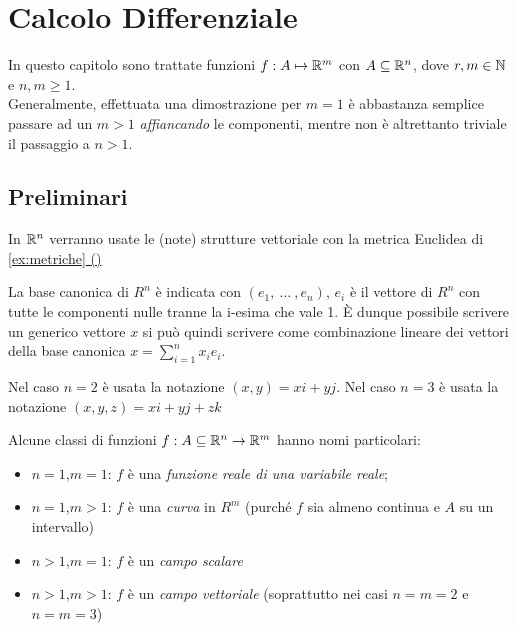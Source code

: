 \chapter{Calcolo Differenziale}

In questo capitolo sono trattate funzioni $f: A \mapsto \mathbb{R}^m$ con $A \subseteq \mathbb{R}^n$, dove $r,m \in \mathbb{N}$ e $n,m \geq 1$.\\
Generalmente, effettuata una dimostrazione per $m = 1$ è abbastanza semplice passare ad un $m > 1$ \textit{affiancando} le componenti, mentre non è altrettanto triviale il passaggio a $n > 1$.

\section{Preliminari}
In $\mathbb{R}^n$ verranno usate le (note) strutture vettoriale con la metrica Euclidea di \hyperref[ex:dist_eucl]{\cref*{ex:metriche} ()} %

La base canonica di $R^n$ è indicata con $(e_1,\:\dotsc\:,e_n)$, $e_i$ è il vettore di $R^n$ con tutte le componenti nulle tranne la i-esima che vale 1. È dunque possibile scrivere un generico vettore $x$ si può quindi scrivere come combinazione lineare dei vettori della base canonica $x=\sum\limits_{i=1}^{n} x_i e_i$.

Nel caso $n=2$ è usata la notazione $(x,y)=xi+yj$. Nel caso $n=3$ è usata la notazione $(x,y,z)=xi+yj+zk$

Alcune classi di funzioni $f:A\subseteq\mathbb{R}^n\rightarrow\mathbb{R}^m$ hanno nomi particolari:
\begin{itemize}
	\item $n=1$,$m=1$: $f$ è una \textit{funzione reale di una variabile reale};
	\item $n=1$,$m>1$: $f$ è una \textit{curva} in $R^m$ (purché $f$ sia almeno continua e $A$ su un intervallo)
	\item $n>1$,$m=1$: $f$ è un \textit{campo scalare}
	\item $n>1$,$m>1$: $f$ è un \textit{campo vettoriale} (soprattutto nei casi $n=m=2$ e $n=m=3$)
\end{itemize}

\newpage
